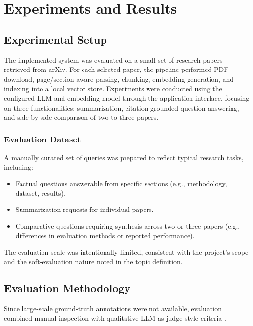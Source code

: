\chapter{Experiments and Results}

\section{Experimental Setup}
The implemented system was evaluated on a small set of research papers retrieved from arXiv. For each selected paper, the pipeline performed PDF download, page/section-aware parsing, chunking, embedding generation, and indexing into a local vector store. Experiments were conducted using the configured LLM and embedding model through the application interface, focusing on three functionalities: summarization, citation-grounded question answering, and side-by-side comparison of two to three papers.

\subsection{Evaluation Dataset}
A manually curated set of queries was prepared to reflect typical research tasks, including:
\begin{itemize}
    \item Factual questions answerable from specific sections (e.g., methodology, dataset, results).
    \item Summarization requests for individual papers.
    \item Comparative questions requiring synthesis across two or three papers (e.g., differences in evaluation methods or reported performance).
\end{itemize}
The evaluation scale was intentionally limited, consistent with the project's scope and the soft-evaluation nature noted in the topic definition.

\section{Evaluation Methodology}
Since large-scale ground-truth annotations were not available, evaluation combined manual inspection with qualitative LLM-as-judge style criteria \cite{b13}.

